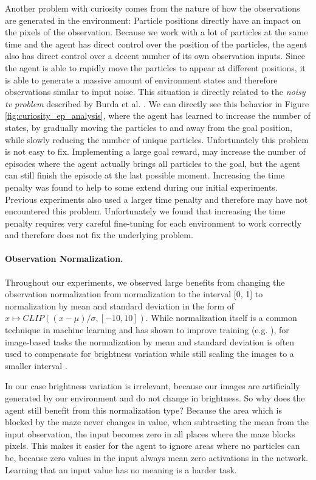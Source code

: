 Another problem with curiosity comes from the nature of how the observations are generated in the environment: Particle positions directly have an impact on the pixels of the observation. Because we work with a lot of particles at the same time and the agent has direct control over the position of the particles, the agent also has direct control over a decent number of its own observation inputs. Since the agent is able to rapidly move the particles to appear at different positions, it is able to generate a massive amount of environment states and therefore observations similar to input noise. This situation is directly related to the \textit{noisy tv problem} described by Burda et al. \cite{burda2018large}. We can directly see this behavior in Figure \ref{fig:curiosity_ep_analysis}, where the agent has learned to increase the number of states, by gradually moving the particles to and away from the goal position, while slowly reducing the number of unique particles. Unfortunately this problem is not easy to fix. Implementing a large goal reward, may increase the number of episodes where the agent actually brings all particles to the goal, but the agent can still finish the episode at the last possible moment. Increasing the time penalty was found to help to some extend during our initial experiments. Previous experiments \cite{huang2019,becker2020} also used a larger time penalty and therefore may have not encountered this problem. Unfortunately we found that increasing the time penalty requires very careful fine-tuning for each environment to work correctly and therefore does not fix the underlying problem.

\paragraph{Observation Normalization. } Throughout our experiments, we observed large benefits from changing the observation normalization from normalization to the interval [0, 1] to normalization by mean and standard deviation in the form of $x \mapsto CLIP((x - \mu)/\sigma, [-10, 10])$. While normalization itself is a common technique in machine learning and has shown to improve training (e.g. \cite{jayalakshmi2011statistical}), for image-based tasks the normalization by mean and standard deviation is often used to compensate for brightness variation while still scaling the images to a smaller interval \cite{pal2016preprocessing}. 

In our case brightness variation is irrelevant, because our images are artificially generated by our environment and do not change in brightness. So why does the agent still benefit from this normalization type? Because the area which is blocked by the maze never changes in value, when subtracting the mean from the input observation, the input becomes zero in all places where the maze blocks pixels. This makes it easier for the agent to ignore areas where no particles can be, because zero values in the input always mean zero activations in the network. Learning that an input value has no meaning is a harder task.

